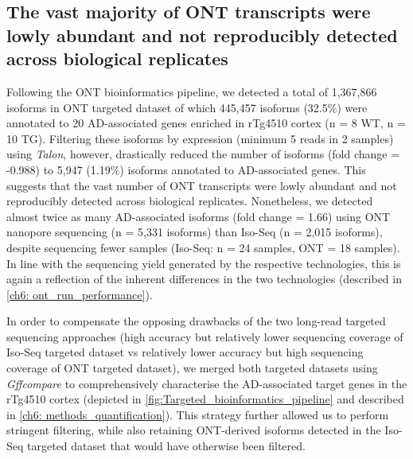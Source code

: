 \clearpage
\subsection{The vast majority of ONT transcripts were lowly abundant and not reproducibly detected across biological replicates}
Following the ONT bioinformatics pipeline, we detected a total of 1,367,866 isoforms in ONT targeted dataset of which 445,457 isoforms (32.5\%) were annotated to 20 AD-associated genes enriched in rTg4510 cortex (n = 8 WT, n = 10 TG). Filtering these isoforms by expression (minimum 5 reads in 2 samples) using \textit{Talon}, however, drastically reduced the number of isoforms (fold change = -0.988) to 5,947 (1.19\%) isoforms annotated to AD-associated genes. This suggests that the vast number of ONT transcripts were lowly abundant and not reproducibly detected across biological replicates. Nonetheless, we detected almost twice as many AD-associated isoforms (fold change = 1.66) using ONT nanopore sequencing (n = 5,331 isoforms) than Iso-Seq (n = 2,015 isoforms), despite sequencing fewer samples (Iso-Seq: n = 24 samples, ONT = 18 samples). In line with the sequencing yield generated by the respective technologies, this is again a reflection of the inherent differences in the two technologies (described in \cref{ch6: ont_run_performance}). 

In order to compensate the opposing drawbacks of the two long-read targeted sequencing approaches (high accuracy but relatively lower sequencing coverage of Iso-Seq targeted dataset vs relatively lower accuracy but high sequencing coverage of ONT targeted dataset), we merged both targeted datasets using \textit{Gffcompare} to comprehensively characterise the AD-associated target genes in the rTg4510 cortex (depicted in \cref{fig:Targeted_bioinformatics_pipeline} and described in \cref{ch6: methods_quantification}). This strategy further allowed us to perform stringent filtering, while also retaining ONT-derived isoforms detected in the Iso-Seq targeted dataset that would have otherwise been filtered. 

